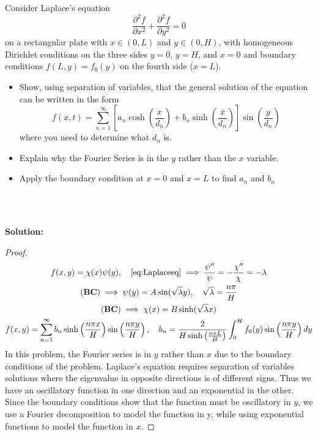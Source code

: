 Consider Laplace's equation
\begin{equation}
    \frac{\partial^2 f}{\partial x^2} + \frac{\partial^2 f}{\partial y^2} = 0 
    \label{eq:Laplaceeq}
\end{equation}
on a rectangular plate with $x \in (0,L)$ and $y \in (0,H)$, with homogeneous Dirichlet conditions on the three sides $y = 0$, $y= H$, and $x = 0$ and boundary conditions $f(L,y) = f_0(y)$ on the fourth side ($x= L$). 
\begin{itemize}
\item Show, using separation of variables, that the general solution of the equation can be written in the form
\begin{equation}
f(x,t) =  \sum_{n=1}^\infty \left[ a_n \cosh \left(\frac{x}{d_n}  \right)  + b_n \sinh \left(\frac{x}{d_n}  \right)\right] \sin \left(\frac{y}{d_n}  \right) 
\end{equation} 
where you need to determine what $d_n$ is.
\item Explain why the Fourier Series is in the $y$ rather than the $x$ variable.
\item Apply the boundary condition at $x = 0$ and $x = L$ to find $a_n$ and $b_n$ 
\end{itemize}
\\
\\
{\color{red} {\bf Solution: 

\begin{proof}

    \begin{gather*}
        f(x,y) = \chi(x)\psi(y), \quad \eqref{eq:Laplaceeq} \implies \frac{\psi ''}{\psi} = - \frac{\chi ''}{\chi} = -\lambda \\
        (\mathbf{BC}) \implies \psi(y) = A\sin(\sqrt{\lambda}y), \quad \sqrt{\lambda} = \frac{n\pi}{H}\\
        (\mathbf{BC}) \implies \chi(x) = B\sinh(\sqrt{\lambda}x)\\
        f(x,y) = \sum_{n=1}^{\infty} b_n \sinh\left(\frac{n\pi x}{H}\right)\sin\left(\frac{n\pi y}{H}\right), \quad b_n = \frac{2}{H\sinh\left(\frac{n\pi L}{H}\right)} \int_0^H f_0(y)\sin\left(\frac{n\pi y}{H}\right) dy
    \end{gather*}
    In this problem, the Fourier series is in $y$ rather than $x$ due to the boundary conditions of the problem. Laplace's equation requires separation of variables solutions where the eigenvalue in opposite directions is of different signs. Thus we have an oscillatory function in one direction and an exponential in the other. Since the boundary conditions show that the function must be oscillatory in $y$, we use a Fourier decomposition to model the function in y, while using exponential functions to model the function in $x$. 

\end{proof}
}}
